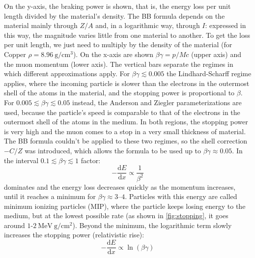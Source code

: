 \documentclass[11pt,a4paper,twoside,openright]{report}
\begin{document}
\noindent On the y-axis, the braking power is shown, that is, the energy loss per unit length divided by the material's density. The BB formula depends on the material mainly through $Z/A$ and, in a logarithmic way, through $I$: expressed in this way, the magnitude varies little from one material to another. To get the loss per unit length, we just need to multiply by the density of the material (for Copper $\rho = 8.96~\mathrm{g/cm^3}$). On the x-axis are shown $\beta\gamma = p/Mc$ (upper axis) and the muon momentum (lower axis). The vertical bars separate the regimes in which different approximations apply. For $\beta\gamma \lesssim 0.005$ the Lindhard-Scharff regime applies, where the incoming particle is slower than the electrons in the outermost shell of the atoms in the material, and the stopping power is proportional to $\beta$. For $0.005 \lesssim \beta\gamma \lesssim 0.05$ instead, the Anderson and Ziegler parameterizations are used, because the particle's speed is comparable to that of the electrons in the outermost shell of the atoms in the medium. In both regions, the stopping power is very high and the muon comes to a stop in a very small thickness of material. The BB formula couldn't be applied to these two regimes, so the shell correction $-C/Z$ was introduced, which allows the formula to be used up to $\beta\gamma \approx 0.05$. In the interval $0.1 \lesssim \beta\gamma \lesssim 1$ factor:
\begin{equation}
  -\frac{\mathrm{d}E}{\mathrm{d}x} \propto \frac{1}{\beta^2}
\end{equation}
dominates and the energy loss decreases quickly as the momentum increases, until it reaches a minimum for $\beta\gamma \approx 3$--$4$. Particles with this energy are called minimum ionizing particles (MIP), where the particle keeps losing energy to the medium, but at the lowest possible rate (as shown in \cref{fig:stopping}, it goes around $1\text{-}2\ \mathrm{MeV\ g/cm^2}$). Beyond the minimum, the logarithmic term slowly increases the stopping power (relativistic rise):
\begin{equation}
  -\frac{\mathrm{d}E}{\mathrm{d}x} \propto \ln(\beta\gamma)
\end{equation}
\end{document}
